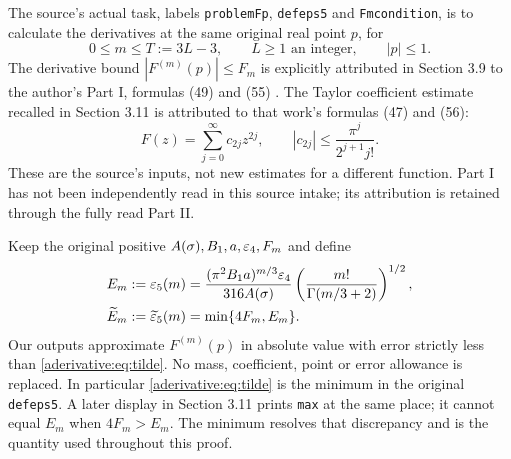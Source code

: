 The source's actual task, labels \texttt{problemFp},
\texttt{defeps5} and \texttt{Fmcondition}, is to calculate the
derivatives at the same original real point $p$, for
\begin{equation}\label{aderivative:eq:indices}
0\le m\le T:=3L-3,\qquad L\ge1\text{ an integer},\qquad |p|\le1.
\end{equation}
The derivative bound $|F^{(m)}(p)|\le F_m$ is explicitly attributed
in Section 3.9 to the author's Part I, formulas (49) and (55)
\cite{aderivative:AriasI}. The Taylor coefficient estimate recalled in Section
3.11 is attributed to that work's formulas (47) and (56):
\begin{equation}\label{aderivative:eq:Fclass}
F(z)=\sum_{j=0}^{\infty}c_{2j}z^{2j},\qquad
|c_{2j}|\le\frac{\pi^j}{2^{j+1}j!}.
\end{equation}
These are the source's inputs, not new estimates for a different
function. Part I has not been independently read in this source
intake; its attribution is retained through the fully read Part II.

Keep the original positive $A(\sigma),B_1,a,\varepsilon_4,F_m$ and define
\begin{align}
E_m:=\varepsilon_5(m)
&=\frac{(\pi^2B_1a)^{m/3}\varepsilon_4}{316A(\sigma)}
\left(\frac{m!}{\Gamma(m/3+2)}\right)^{1/2},\label{aderivative:eq:eps5}\\
\widetilde E_m:=\widetilde{\varepsilon}_5(m)
&=\min\{4F_m,E_m\}.\label{aderivative:eq:tilde}
\end{align}
Our outputs approximate $F^{(m)}(p)$ in absolute value with error
strictly less than \eqref{aderivative:eq:tilde}. No mass, coefficient, point
or error allowance is replaced. In particular \eqref{aderivative:eq:tilde}
is the minimum in the original \texttt{defeps5}. A later display
in Section 3.11 prints \texttt{max} at the same place; it cannot
equal $E_m$ when $4F_m>E_m$. The minimum resolves that discrepancy
and is the quantity used throughout this proof.

